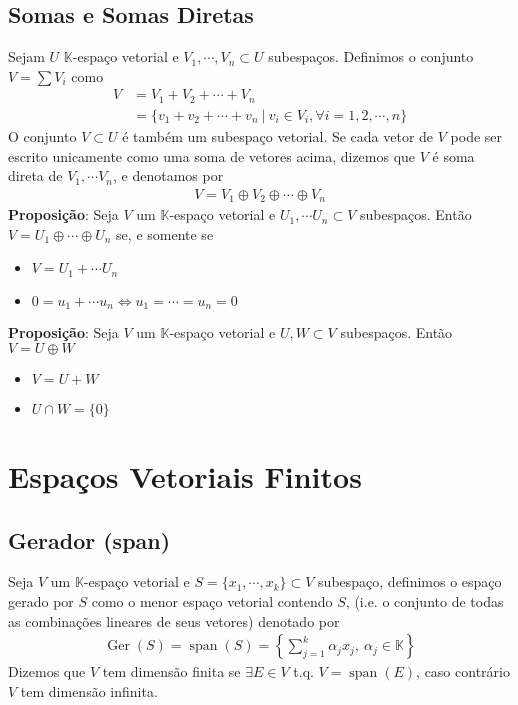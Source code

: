 \documentclass{article}
\newcommand{\K}{\mathbb{K}}
\DeclareMathOperator{\Span}{span}
\begin{document}
\newpage

\subsection{Somas e Somas Diretas}

Sejam $U$ $\K$-espaço vetorial e $V_1, \cdots, V_n \subset U$ subespaços. Definimos o conjunto $V = \sum V_i$ como
\begin{align*}
    V   &= V_1 + V_2 + \cdots + V_n \\
        &= \{ v_1 + v_2 + \cdots + v_n \: | \: v_i \in V_i, \forall i = 1,2,\cdots,n \}
\end{align*}
O conjunto $V \subset U$ é também um subespaço vetorial. Se cada vetor de $V$ pode ser escrito unicamente como uma soma de vetores acima, dizemos que $V$ é soma direta de $V_1, \cdots V_n$, e denotamos por
\begin{align*}
    V = V_1 \oplus V_2 \oplus \cdots \oplus V_n
\end{align*} \vspace{5mm}
\textbf{Proposição}: Seja $V$ um $\K$-espaço vetorial e $U_1, \cdots U_n \subset V$ subespaços. Então $V = U_1 \oplus \cdots \oplus U_n$ se, e somente se
\begin{itemize}
    \item $V = U_1 + \cdots U_n$
    \item $0 = u_1 + \cdots u_n \iff u_1 = \cdots = u_n = 0$
\end{itemize} \vspace{5mm}
\textbf{Proposição}:  Seja $V$ um $\K$-espaço vetorial e $U, W \subset V$ subespaços. Então $V = U \oplus W$
\begin{itemize}
    \item $V = U + W$
    \item $U \cap W = \{0\}$
\end{itemize}

\newpage

\section{Espaços Vetoriais Finitos}

\subsection{Gerador (span)}

Seja $V$ um $\K$-espaço vetorial e $S = \{ x_1, \cdots, x_k \} \subset V$ subespaço, definimos o espaço gerado por $S$ como o menor espaço vetorial contendo $S$,  (i.e. o conjunto de todas as combinações lineares de seus vetores) denotado por
\begin{align*}
    \operatorname{Ger}(S) = \Span(S) = \left\{ \sum_{j=1}^k \alpha_jx_j,\: \alpha_j \in \K \right\}
\end{align*}
Dizemos que $V$ tem dimensão finita se $\exists E \in V$ t.q. $V = \Span(E)$, caso contrário $V$ tem dimensão infinita.
\end{document}

